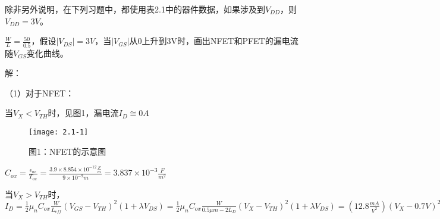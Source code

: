 


\setcounter{tocdepth}{1}                %
\setcounter{secnumdepth}{0}             %

\titleformat{\chapter}{\huge}{}{1em}{}


除非另外说明，在下列习题中，都使用表2.1中的器件数据，如果涉及到$V_{DD}$，则$V_{DD}=3V$。



$\frac{W}{L}=\frac{50}{0.5}$，假设$|V_{DS}|=3V$，当$|V_{GS}|$从0上升到3V时，画出NFET和PFET的漏电流随$V_{GS}$变化曲线。




解：

（1）对于NFET：
	
当$V_X<V_{TH}$时，见图1，漏电流$I_D\cong0A$
	\begin{figure}[H] %
	\centering %
	\begin{minipage}{\linewidth}
		\texttt{[image: 2.1-1]}
	\end{minipage}
	\caption*{图1：NFET的示意图} %
	\label{fig1} %
\end{figure}

$C_{ox}=\frac{\epsilon_{ox}}{T_{ox}}=\frac{3.9 \times 8.854 \times 10^{-12}\frac{F}{m}}{9 \times 10^{-9}m}=3.837 \times 10^{-3}\frac{F}{m^2}$

当$V_X>V_{TH}$时，$I_D=\frac{1}{2}\mu_nC_{ox}\frac{W}{L_{eff}}(V_{GS}-V_{TH})^2(1+\lambda V_{DS})=\frac{1}{2}\mu_nC_{ox}\frac{W}{0.5\mu m-2L_D}(V_{X}-V_{TH})^2(1+\lambda V_{DS})=(12.8\frac{mA}{V^2})(V_X-0.7V)^2$



